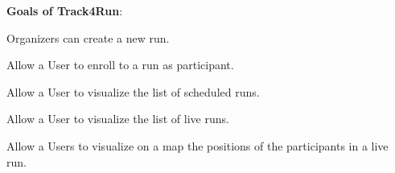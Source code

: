 \textbf{Goals of Track4Run}:
\begin{enumerate}[label={[}G5.\arabic*{]}]

    \item \label{goal:run1}Organizers can create a new run.
    \item \label{goal:run2}Allow a User to enroll to a run as participant.
    \item \label{goal:run3}Allow a User to visualize the list of scheduled runs.
     \item\label{goal:run4}Allow a User to visualize the list of live runs.
    \item \label{goal:run5}Allow a Users to visualize on a map the positions of the participants in a live run.
   
    
\end{enumerate}
